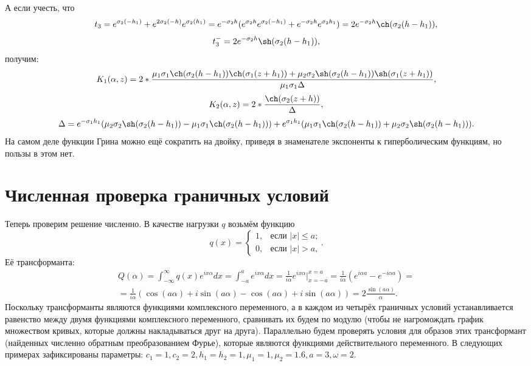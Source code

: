 \documentclass[a4paper, 12pt]{article}
\newcommand{\s}[1]{\sigma_{#1}}
\newcommand{\m}[1]{\mu_{#1}}
\newcommand{\E}[2]{e^{#1 #2}}
\begin{document}
А если учесть, что
$$t_3=\E{\s{2}}{(-h_1)}+ \E{2\s{2}}{(-h)} \E{\s{2}}{(h_1)}=e^{-\s{2}h}(e^{\s{2}h}e^{\s{2}(-h_1)}+e^{-\s{2}h}e^{\s{2}h_1})=2e^{-\s{2}h}\ch(\s{2}(h-h_1)),$$
$$t_3^-=2e^{-\s{2}h}\sh(\s{2}(h-h_1)),$$
получим:
$$K_1(\alpha,z)=2*\frac{\m{1}\s{1}\ch(\s{2}(h-h_1))\ch(\s{1}(z+h_1))+\m{2}\s{2}\sh(\s{2}(h-h_1))\sh(\s{1}(z+h_1))}{\mu_1 \sigma_1 \Delta},$$
$$K_2(\alpha,z)=2*\frac{\ch(\s{2}(z+h))}{\Delta},$$
$$\Delta=\E{-\s{1}}{h_1}(\m{2}\s{2}\sh(\s{2}(h-h_1))-\m{1}\s{1}\ch(\s{2}(h-h_1)))+\E{\s{1}}{h_1}(\m{1}\s{1}\ch(\s{2}(h-h_1))+\m{2}\s{2}\sh(\s{2}(h-h_1))) .$$
На самом деле функции Грина можно ещё сократить на двойку, приведя в знаменателе экспоненты к гиперболическим функциям, но пользы в этом нет.

\section{Численная проверка граничных условий}
Теперь проверим решение численно. В качестве нагрузки $q$ возьмём функцию
\[
q(x) =
\begin{cases}
1, & \text{если $|x|\leq a$;} \\
0, & \text{если $|x|>a$,}
\end{cases}.
\]
Её трансформанта:
\begin{multline}
  Q(\alpha)=\int_{-\infty}^{\infty}q(x)e^{ix\alpha} dx=\int_{-a}^{a}e^{ix\alpha} dx=\frac{1}{i\alpha}e^{ix\alpha}|_{x=-a}^{x=a}=\frac{1}{i\alpha}\left(e^{i\alpha a}-e^{-i\alpha a} \right)=\\
=\frac{1}{i\alpha}\left(\cos(a\alpha)+i\sin(a\alpha)-\cos(a\alpha)+i\sin(a\alpha) \right)=2\frac{\sin(a\alpha)}{\alpha} .  
\end{multline}
Поскольку трансформанты являются функциями комплексного переменного, а в каждом из четырёх граничных условий устанавливается равенство между двумя функциями комплексного переменного, сравнивать их будем по модулю (чтобы не нагромождать график множеством кривых, которые должны накладываться друг на друга). Параллельно будем проверять условия для образов этих трансформант (найденных численно обратным преобразованием Фурье), которые являются функциями действительного переменного. В следующих примерах зафиксированы параметры: $c_1=1, c_2=2, h_1=h_2=1, \mu_1=1, \mu_2=1.6, a=3, \omega=2$.
\end{document}
